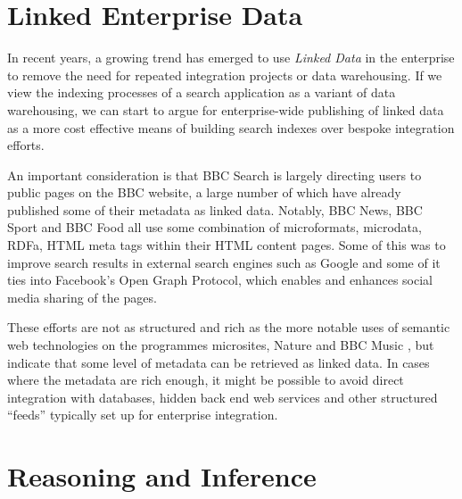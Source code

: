 \section{Linked Enterprise Data}
\label{linked-enterprise-data}

In recent years, a growing trend has emerged to use
\emph{Linked Data} in the enterprise to remove the need
for repeated integration projects or data warehousing.
\cite{allemang2010semantic} If we view the indexing processes
of a search application as a variant of data warehousing,
we can start to argue for enterprise-wide publishing of
linked data as a more cost effective means of building search
indexes over bespoke integration efforts.

An important consideration is that BBC Search is largely directing
users to public pages on the BBC website, a large number of which have
already published some of their metadata as linked data. Notably, BBC News,
BBC Sport and BBC Food all use some combination
of microformats, microdata, RDFa, HTML meta tags within their HTML content
pages. Some of this was to improve search results in external search engines
such as Google and some of it ties into Facebook's Open Graph Protocol, which
enables and enhances social media sharing of the pages.

These efforts are not as structured and rich as the more notable uses
of semantic web technologies on the programmes microsites, Nature and BBC
Music \cite{raimond2010use}, but indicate that some level of metadata
can be retrieved
as linked data. In cases where the metadata are rich enough, it might be
possible to avoid direct integration with databases, hidden back end
web services and other structured ``feeds'' typically set up for enterprise
integration.

\section{Reasoning and Inference}
\label{reasoning}
